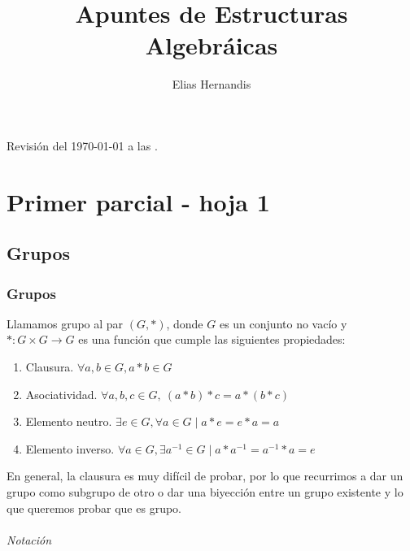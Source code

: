 \documentclass{book}
\title{Apuntes de Estructuras Algebráicas}
\author{Elias Hernandis}
\theoremstyle{definition}
\theoremstyle{remark}
\newcommand{\inv}[1]{#1^{-1}}
\begin{document}
\maketitle
Revisión del \today $ $ a las \currenttime.

\tableofcontents

\part{Primer parcial - hoja 1}

\chapter{Grupos}

\section{Grupos}

\begin{dfn}[Grupo]
	Llamamos grupo al par $(G, \ast)$, donde $G$ es un conjunto no vacío y $\ast: G \times G \to G$ es una función que cumple las siguientes propiedades:
	\begin{enumerate}
		\item Clausura. $\forall a, b \in G, a \ast b \in G$
		\item Asociatividad. $\forall a, b, c \in G,\ (a \ast b) \ast c = a \ast (b \ast c)$
		\item Elemento neutro. $\exists e \in G, \forall a \in G \mid a \ast e = e \ast a = a$
		\item Elemento inverso. $\forall a \in G, \exists \inv{a} \in G \mid a \ast \inv{a} = \inv{a} \ast a = e$
	\end{enumerate}
\end{dfn}

En general, la clausura es muy difícil de probar, por lo que recurrimos a dar un grupo como subgrupo de otro o dar una biyección entre un grupo existente y lo que queremos probar que es grupo.

\paragraph{Notación}
\end{document}
